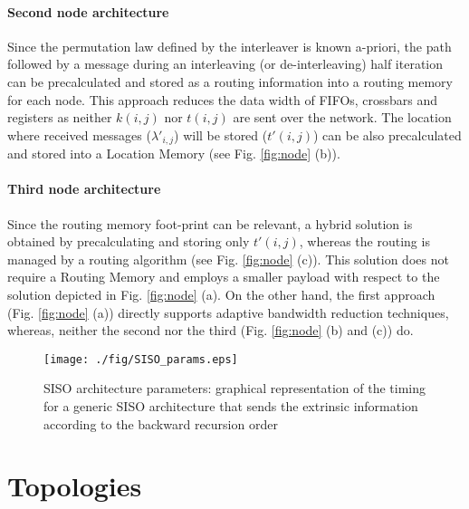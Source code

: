 \documentclass[10pt,twocolumn,journal]{IEEEtran}
\begin{document}
\paragraph{Second node architecture}
Since the permutation law defined by the interleaver is known a-priori, the path followed by 
a message during an interleaving (or de-interleaving) half iteration can be precalculated and stored 
as a routing information into a routing memory for each node. This approach 
reduces the data width of FIFOs, crossbars and registers as neither $k(i,j)$ nor $t(i,j)$ are sent over the 
network. The location where received messages ($\lambda'_{i,j}$) will be stored ($t'(i,j)$) can be also precalculated and stored into a Location Memory (see Fig. \ref{fig:node} (b)). 
\paragraph{Third node architecture}
Since the routing memory foot-print can be relevant, a hybrid solution is obtained by precalculating and storing 
only $t'(i,j)$, whereas the routing is managed by a routing algorithm (see Fig. \ref{fig:node} (c)).
This solution does not require a Routing Memory and employs a smaller payload with respect to the solution depicted 
in Fig. \ref{fig:node} (a). On the other hand, the first approach (Fig. \ref{fig:node} (a)) directly supports adaptive 
bandwidth reduction techniques, whereas, neither the second nor the third (Fig. \ref{fig:node} (b) and (c)) do.

\begin{figure}
  \centering
  \texttt{[image: ./fig/SISO\_params.eps]}
\caption{SISO architecture parameters: graphical representation of the timing for a generic SISO architecture 
that sends the extrinsic information according to the backward recursion order}
\label{fig:SISO_params}
\end{figure}

\section{Topologies}
\label{sec:topologies}
\end{document}
